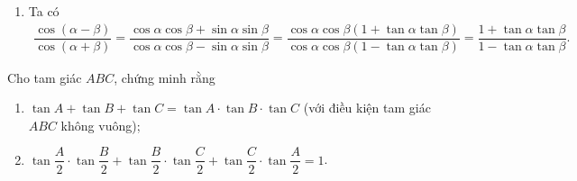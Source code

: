 \begin{ex}
{\begin{enumerate}
$$\begin{array}{l}
=\left(-\sin 3\alpha+\sin 5\alpha\right)+\left(-\sin\alpha+\sin  3\alpha\right)+\sin\alpha\\
 =\sin 5\alpha.
\end{array}$$
\item Ta có $$\begin{array}{l}
\dfrac{\cos\left(\alpha-\beta\right)}{\cos\left(\alpha+\beta\right)}=\dfrac{\cos\alpha\cos\beta+\sin\alpha\sin\beta}{\cos\alpha\cos\beta-\sin\alpha\sin\beta} 
 =\dfrac{\cos\alpha\cos\beta\left(1+\tan\alpha\tan\beta\right)}{\cos\alpha\cos\beta\left(1-\tan\alpha\tan\beta\right)}
=\dfrac{1+\tan\alpha\tan\beta}{1-\tan\alpha\tan\beta}. 
\end{array}$$
\end{enumerate}
 }
\end{ex}

\begin{ex}%
	Cho tam giác $ ABC$, chứng minh  rằng
	\begin{enumerate}
		\item $\tan A+\tan B+\tan C=\tan A\cdot\tan B\cdot\tan C$ (với  điều kiện tam giác $ ABC$ không vuông);
		 \item $\tan\dfrac{A}{2}\cdot\tan\dfrac{B}{2}+\tan\dfrac{B}{2}\cdot\tan\dfrac{C}{2}+\tan\dfrac{C}{2}\cdot\tan\dfrac{A}{2}=1$.
	\end{enumerate}
\end{ex}

